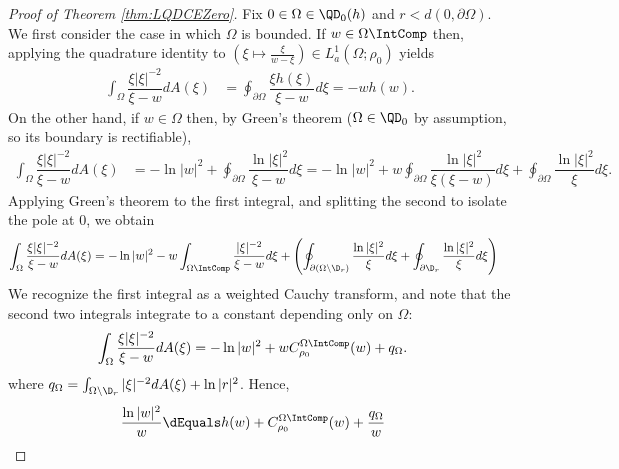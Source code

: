 \documentclass{article}
\numberwithin{equation}{section}
\begin{document}
\begin{proof}[Proof of Theorem \ref{thm:LQDCEZero}]\label{proof:LQDCEZero}
Fix $0\in\Omega\in\QD_0(h)$ and $r<d(0,\partial\Omega)$.
We first consider the case in which $\Omega$ is bounded. If $w\in\Omega\IntComp$ then, applying the quadrature identity to $\left(\xi\mapsto\frac{\xi}{w-\xi}\right)\in L_a^1(\Omega;\rho_0)$ yields
\begin{align*}
    \int_{\Omega}\dfrac{\xi|\xi|^{-2}}{\xi-w}dA(\xi)&=\oint_{\partial\Omega}\dfrac{\xi h(\xi)}{\xi-w}d\xi=-wh(w).
\end{align*}
On the other hand, if $w\in\Omega$ then, by Green's theorem ($\Omega\in\QD_0$ by assumption, so its boundary is rectifiable), 
\begin{align*}
    \int_{\Omega}\dfrac{\xi|\xi|^{-2}}{\xi-w}dA(\xi)&=-\ln|w|^2+\oint_{\partial\Omega}\dfrac{\ln|\xi|^2}{\xi-w}d\xi=-\ln|w|^2+w\oint_{\partial\Omega}\dfrac{\ln|\xi|^2}{\xi(\xi-w)}d\xi+\oint_{\partial\Omega}\dfrac{\ln|\xi|^2}{\xi}d\xi.
\end{align*}
Applying Green's theorem to the first integral, and splitting the second to isolate the pole at $0$, we obtain
\begin{align*}
    \int_{\Omega}\dfrac{\xi|\xi|^{-2}}{\xi-w}dA(\xi)&=-\ln|w|^2-w\int_{\Omega\IntComp}\dfrac{|\xi|^{-2}}{\xi-w}d\xi+\left(\oint_{\partial(\Omega\setminus\D_r)}\dfrac{\ln|\xi|^2}{\xi}d\xi+\oint_{\partial\D_r}\dfrac{\ln|\xi|^2}{\xi}d\xi\right)
\end{align*}
We recognize the first integral as a weighted Cauchy transform, and note that the second two integrals integrate to a constant depending only on $\Omega$:
\begin{align*}
    \int_{\Omega}\dfrac{\xi|\xi|^{-2}}{\xi-w}dA(\xi)&=-\ln|w|^2+wC_{\rho_0}^{\Omega\IntComp}(w)+q_{\Omega}.
\end{align*}
where $q_\Omega=\int_{\Omega\setminus\D_r}|\xi|^{-2}dA(\xi)+\ln|r|^2$. Hence,
\begin{align*}
    \dfrac{\ln|w|^2}{w}&\dEquals h(w)+C_{\rho_0}^{\Omega\IntComp}(w)+\dfrac{q_{\Omega}}{w}
\end{align*}


\end{proof}
\end{document}
